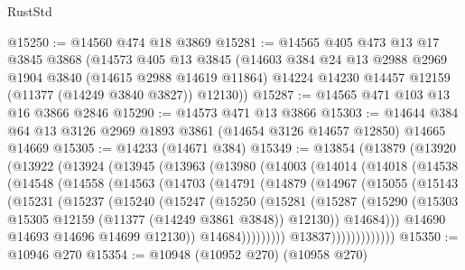 \begin{lexlean}{RustStd}
\begin{coremodule}
@15250 := @14560 @474 @18 @3869
@15281 := @14565
    @405
    @473
    @13
    @17
    @3845
    @3868
    (@14573
      @405
      @13
      @3845
      (@14603
        @384
        @24
        @13
        @2988
        @2969
        @1904
        @3840
        (@14615 @2988 @14619 @11864)
        @14224
        @14230
        @14457
        @12159
        (@11377 (@14249 @3840 @3827))
        @12130))
@15287 := @14565 @471 @103 @13 @16 @3866 @2846
@15290 := @14573 @471 @13 @3866
@15303 := @14644 @384 @64 @13 @3126 @2969 @1893 @3861 (@14654 @3126 @14657 @12850) @14665 @14669
@15305 := @14233 (@14671 @384)
@15349 := @13854
    (@13879
      (@13920
        (@13922
          (@13924
            (@13945
              (@13963
                (@13980
                  (@14003
                    (@14014
                      (@14018
                        (@14538
                          (@14548
                            (@14558
                              (@14563
                                (@14703
                                  (@14791
                                    (@14879
                                      (@14967
                                        (@15055
                                          (@15143
                                            (@15231
                                              (@15237
                                                (@15240
                                                  (@15247
                                                    (@15250
                                                      (@15281
                                                        (@15287
                                                          (@15290
                                                            (@15303
                                                              @15305
                                                              @12159
                                                              (@11377 (@14249 @3861 @3848))
                                                              @12130))
                                                          @14684)))
                                                    @14690
                                                    @14693
                                                    @14696
                                                    @14699
                                                    @12130))
                                                @14684)))))))))
                              @13837)))))))))))))
@15350 := @10946 @270
@15354 := @10948 (@10952 @270) (@10958 @270)

\end{coremodule}
\end{lexlean}
